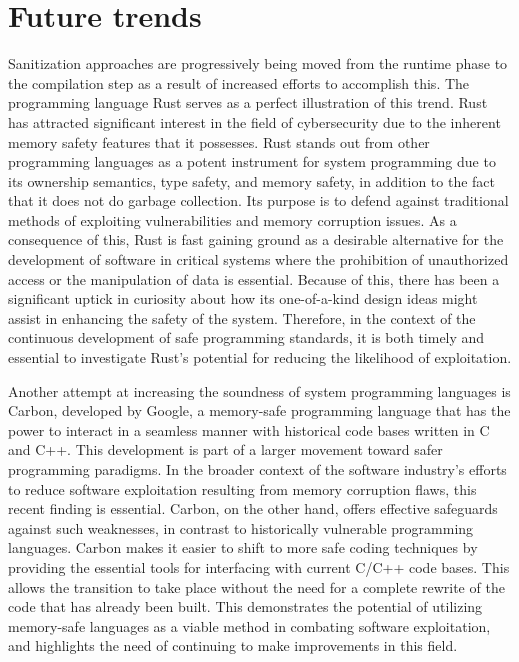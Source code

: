 \documentclass{article}
\begin{document}
\section{Future trends}%
Sanitization approaches are progressively being moved from the runtime phase to the compilation step as a result of increased efforts to accomplish this. The programming language Rust serves as a perfect illustration of this trend. Rust has attracted significant interest in the field of cybersecurity due to the inherent memory safety features that it possesses. Rust stands out from other programming languages as a potent instrument for system programming due to its ownership semantics, type safety, and memory safety, in addition to the fact that it does not do garbage collection. Its purpose is to defend against traditional methods of exploiting vulnerabilities and memory corruption issues. As a consequence of this, Rust is fast gaining ground as a desirable alternative for the development of software in critical systems where the prohibition of unauthorized access or the manipulation of data is essential. Because of this, there has been a significant uptick in curiosity about how its one-of-a-kind design ideas might assist in enhancing the safety of the system. Therefore, in the context of the continuous development of safe programming standards, it is both timely and essential to investigate Rust's potential for reducing the likelihood of exploitation.

Another attempt at increasing the soundness of system programming languages is Carbon, developed by Google, a memory-safe programming language that has the power to interact in a seamless manner with historical code bases written in C and C++. This development is part of a larger movement toward safer programming paradigms. In the broader context of the software industry's efforts to reduce software exploitation resulting from memory corruption flaws, this recent finding is essential. Carbon, on the other hand, offers effective safeguards against such weaknesses, in contrast to historically vulnerable programming languages. Carbon makes it easier to shift to more safe coding techniques by providing the essential tools for interfacing with current C/C++ code bases. This allows the transition to take place without the need for a complete rewrite of the code that has already been built. This demonstrates the potential of utilizing memory-safe languages as a viable method in combating software exploitation, and highlights the need of continuing to make improvements in this field.
\end{document}
